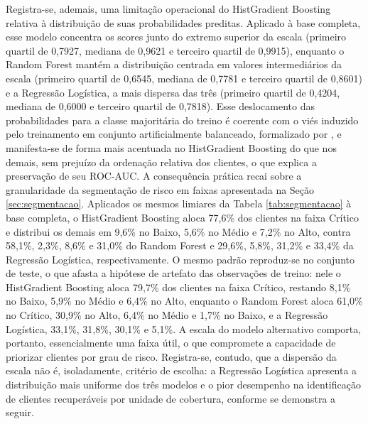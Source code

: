 Registra-se, ademais, uma limitação operacional do HistGradient Boosting relativa à distribuição de suas probabilidades preditas. Aplicado à base completa, esse modelo concentra os scores junto do extremo superior da escala (primeiro quartil de 0,7927, mediana de 0,9621 e terceiro quartil de 0,9915), enquanto o Random Forest mantém a distribuição centrada em valores intermediários da escala (primeiro quartil de 0,6545, mediana de 0,7781 e terceiro quartil de 0,8601) e a Regressão Logística, a mais dispersa das três (primeiro quartil de 0,4204, mediana de 0,6000 e terceiro quartil de 0,7818). Esse deslocamento das probabilidades para a classe majoritária do treino é coerente com o viés induzido pelo treinamento em conjunto artificialmente balanceado, formalizado por , e manifesta-se de forma mais acentuada no HistGradient Boosting do que nos demais, sem prejuízo da ordenação relativa dos clientes, o que explica a preservação de seu ROC-AUC. A consequência prática recai sobre a granularidade da segmentação de risco em faixas apresentada na Seção \ref{sec:segmentacao}. Aplicados os mesmos limiares da Tabela \ref{tab:segmentacao} à base completa, o HistGradient Boosting aloca 77,6\% dos clientes na faixa Crítico e distribui os demais em 9,6\% no Baixo, 5,6\% no Médio e 7,2\% no Alto, contra 58,1\%, 2,3\%, 8,6\% e 31,0\% do Random Forest e 29,6\%, 5,8\%, 31,2\% e 33,4\% da Regressão Logística, respectivamente. O mesmo padrão reproduz-se no conjunto de teste, o que afasta a hipótese de artefato das observações de treino: nele o HistGradient Boosting aloca 79,7\% dos clientes na faixa Crítico, restando 8,1\% no Baixo, 5,9\% no Médio e 6,4\% no Alto, enquanto o Random Forest aloca 61,0\% no Crítico, 30,9\% no Alto, 6,4\% no Médio e 1,7\% no Baixo, e a Regressão Logística, 33,1\%, 31,8\%, 30,1\% e 5,1\%. A escala do modelo alternativo comporta, portanto, essencialmente uma faixa útil, o que compromete a capacidade de priorizar clientes por grau de risco. Registra-se, contudo, que a dispersão da escala não é, isoladamente, critério de escolha: a Regressão Logística apresenta a distribuição mais uniforme dos três modelos e o pior desempenho na identificação de clientes recuperáveis por unidade de cobertura, conforme se demonstra a seguir.

